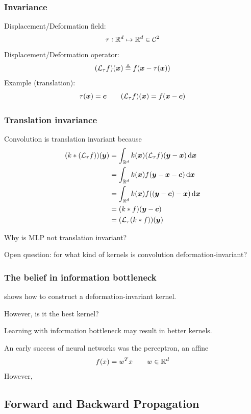 \documentclass{article}
\begin{document}
\subsubsection{Invariance}

Displacement/Deformation field:
\[
\tau: {\mathbb R}^d \mapsto {\mathbb R}^d \in {\mathcal C}^2
\]
Displacement/Deformation operator:
\[
({\mathcal L}_\tau f) ({\bm x}) \triangleq f({\bm x} - \tau ({\bm x}))
\]
Example (translation):
\[
\tau ({\bm x}) = {\bm c} \qquad
({\mathcal L}_\tau f) ({\bm x}) = f({\bm x} - {\bm c})
\]

\subsubsection{Translation invariance}

Convolution is translation invariant because
\begin{align*}
(k * (\call_\tau f)) (\bmy)
& = \int_{\bbr^d} k(\bmx) (\call_\tau f) (\bmy - \bmx) \dif \bmx \\
& = \int_{\bbr^d} k(\bmx) f(\bmy - \bmx - \bmc) \dif \bmx \\
& = \int_{\bbr^d} k(\bmx) f((\bmy - \bmc) - \bmx) \dif \bmx \\
& = (k * f) (\bmy - \bmc) \\
& = (\call_\tau (k * f)) (\bmy)
\end{align*}

Why is MLP not translation invariant?

Open question: for what kind of kernels is convolution deformation-invariant?

\subsubsection{The belief in information bottleneck}

\cite{mallat2012group} shows how to construct a deformation-invariant kernel.

However, is it the best kernel?

Learning with information bottleneck may result in better kernels.

An early success of neural networks was the perceptron, an affine
\[
f(x) = w^T x \qquad w \in {\mathbb R}^d
\]
However,

\subsection{Forward and Backward Propagation}
\end{document}
